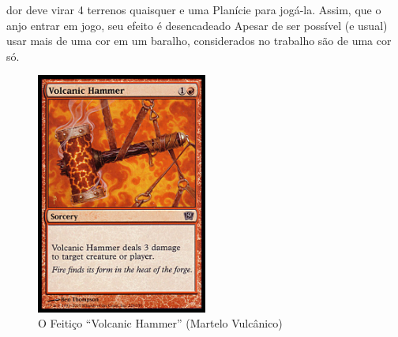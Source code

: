 dor deve virar 4 terrenos quaisquer e uma Planície para jogá-la. Assim, que o anjo entrar em jogo, seu efeito é desencadeado Apesar de ser possível (e usual) usar mais de uma cor em um baralho, considerados no trabalho são de uma cor só.

\begin{figure}[!h]
  \centering
  \includegraphics[width=0.5\textwidth]{picstcc/volcanicfull.png}
  \caption{O Feitiço ``Volcanic Hammer'' (Martelo Vulcânico)}
  \label{volcanicsorcery}
\end{figure}

